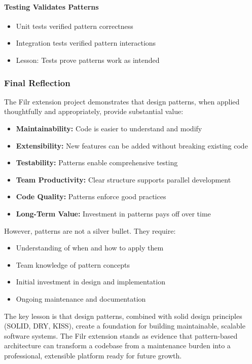 \documentclass[11pt, a4paper]{article}
\theoremstyle{plain}
\theoremstyle{definition}
\begin{document}
\paragraph{Testing Validates Patterns}
\begin{itemize}
    \item Unit tests verified pattern correctness
    \item Integration tests verified pattern interactions
    \item Lesson: Tests prove patterns work as intended
\end{itemize}

\subsubsection{Final Reflection}

The Filr extension project demonstrates that design patterns, when applied thoughtfully and appropriately, provide substantial value:

\begin{itemize}
    \item \textbf{Maintainability:} Code is easier to understand and modify
    \item \textbf{Extensibility:} New features can be added without breaking existing code
    \item \textbf{Testability:} Patterns enable comprehensive testing
    \item \textbf{Team Productivity:} Clear structure supports parallel development
    \item \textbf{Code Quality:} Patterns enforce good practices
    \item \textbf{Long-Term Value:} Investment in patterns pays off over time
\end{itemize}

However, patterns are not a silver bullet. They require:
\begin{itemize}
    \item Understanding of when and how to apply them
    \item Team knowledge of pattern concepts
    \item Initial investment in design and implementation
    \item Ongoing maintenance and documentation
\end{itemize}

The key lesson is that design patterns, combined with solid design principles (SOLID, DRY, KISS), create a foundation for building maintainable, scalable software systems. The Filr extension stands as evidence that pattern-based architecture can transform a codebase from a maintenance burden into a professional, extensible platform ready for future growth.
\end{document}
